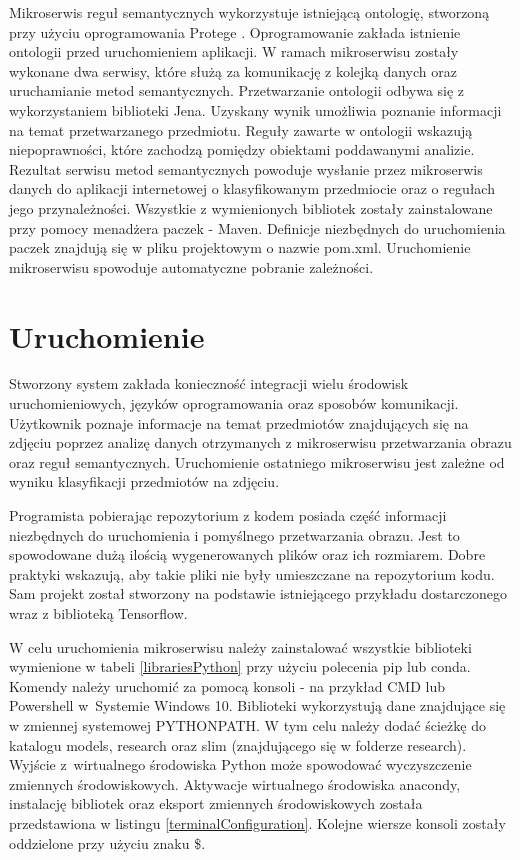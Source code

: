 Mikroserwis reguł semantycznych wykorzystuje istniejącą ontologię, stworzoną przy użyciu oprogramowania Protege \cite{Protege}. Oprogramowanie zakłada istnienie ontologii przed uruchomieniem aplikacji. W ramach mikroserwisu zostały wykonane dwa serwisy, które służą za komunikację z kolejką danych oraz uruchamianie metod semantycznych. Przetwarzanie ontologii odbywa się z wykorzystaniem biblioteki Jena. Uzyskany wynik umożliwia poznanie informacji na temat przetwarzanego przedmiotu. Reguły zawarte w ontologii wskazują niepoprawności, które zachodzą pomiędzy obiektami poddawanymi analizie. Rezultat serwisu metod semantycznych powoduje wysłanie przez mikroserwis danych do aplikacji internetowej o klasyfikowanym przedmiocie oraz o regułach jego przynależności. 
Wszystkie z wymienionych bibliotek zostały zainstalowane przy pomocy menadżera paczek - Maven. Definicje niezbędnych do uruchomienia paczek znajdują się w pliku projektowym o nazwie pom.xml. Uruchomienie mikroserwisu spowoduje automatyczne pobranie zależności.


\section{Uruchomienie}

Stworzony system zakłada konieczność integracji wielu środowisk uruchomieniowych, języków oprogramowania oraz sposobów komunikacji. Użytkownik poznaje informacje na temat przedmiotów znajdujących się na zdjęciu poprzez analizę danych otrzymanych z mikroserwisu przetwarzania obrazu oraz reguł semantycznych. Uruchomienie ostatniego mikroserwisu jest zależne od wyniku klasyfikacji przedmiotów na zdjęciu. 

Programista pobierając repozytorium z kodem posiada część informacji niezbędnych do uruchomienia i pomyślnego przetwarzania obrazu. Jest to spowodowane dużą ilością wygenerowanych plików oraz ich rozmiarem. Dobre praktyki wskazują, aby takie pliki nie były umieszczane na repozytorium kodu. Sam projekt został stworzony na podstawie istniejącego przykładu dostarczonego wraz z biblioteką Tensorflow. 

W celu uruchomienia mikroserwisu należy zainstalować wszystkie biblioteki wymienione w tabeli \ref{librariesPython} przy użyciu polecenia pip lub conda. Komendy należy uruchomić za pomocą konsoli - na przykład CMD lub Powershell\cite{Powershell} w~Systemie Windows 10. Biblioteki wykorzystują dane znajdujące się w zmiennej systemowej PYTHONPATH. W tym celu należy dodać ścieżkę do katalogu models, research oraz slim (znajdującego się w folderze research). Wyjście z~wirtualnego środowiska Python może spowodować wyczyszczenie zmiennych środowiskowych. Aktywacje wirtualnego środowiska anacondy, instalację bibliotek oraz eksport zmiennych środowiskowych została przedstawiona w listingu \ref{terminalConfiguration}. Kolejne wiersze konsoli zostały oddzielone przy użyciu znaku \$.
\newpage

